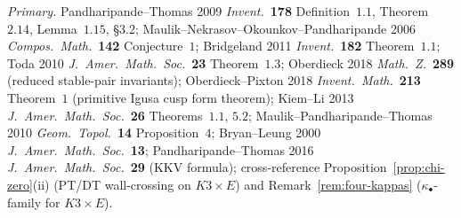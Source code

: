 \begin{remark}[PT/DT at \texorpdfstring{$\chi = 0$}{chi = 0}: naive-ratio killed, cosection-reduction surviving, K3-fibre hidden-pattern]
\emph{Primary.} Pandharipande--Thomas 2009 \emph{Invent.}~\textbf{178} Definition~$1.1$, Theorem~$2.14$, Lemma~$1.15$, \S 3.2; Maulik--Nekrasov--Okounkov--Pandharipande 2006 \emph{Compos.\ Math.}~\textbf{142} Conjecture~$1$; Bridgeland 2011 \emph{Invent.}~\textbf{182} Theorem~$1.1$; Toda 2010 \emph{J.\ Amer.\ Math.\ Soc.}~\textbf{23} Theorem~$1.3$; Oberdieck 2018 \emph{Math.\ Z.}~\textbf{289} (reduced stable-pair invariants); Oberdieck--Pixton 2018 \emph{Invent.\ Math.}~\textbf{213} Theorem~$1$ (primitive Igusa cusp form theorem); Kiem--Li 2013 \emph{J.\ Amer.\ Math.\ Soc.}~\textbf{26} Theorems~$1.1$, $5.2$; Maulik--Pandharipande--Thomas 2010 \emph{Geom.\ Topol.}~\textbf{14} Proposition~$4$; Bryan--Leung 2000 \emph{J.\ Amer.\ Math.\ Soc.}~\textbf{13}; Pandharipande--Thomas 2016 \emph{J.\ Amer.\ Math.\ Soc.}~\textbf{29} (KKV formula); cross-reference Proposition~\ref{prop:chi-zero}(ii) (PT/DT wall-crossing on $K3\times E$) and Remark~\ref{rem:four-kappas} ($\kappa_\bullet$-family for $K3\times E$).
\end{remark}

